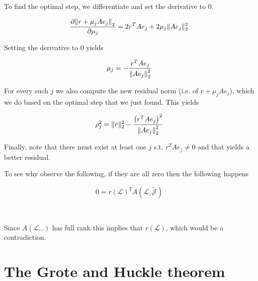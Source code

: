 \documentclass[paper=A4, fontsize=11pt]{scrartcl}
\let\originalleft\left
\let\originalright\right
\renewcommand{\left}{\mathopen{}\mathclose\bgroup\originalleft}
\renewcommand{\right}{\aftergroup\egroup\originalright}
\theoremstyle{remark}
\begin{document}
To find the optimal step, we differentiate and set the derivative to 0. 

\begin{equation}
\begin{aligned}
\frac{\partial \left\|r+\mu_{j} A e_{j}\right\|_{2}}{\partial \mu_{j}} 
& = 2r^{T} A e_{j} + 2\mu_{j}\|A e_{j}\|_{2}^{2}\\
\end{aligned}
\end{equation}

Setting the derivative to $0$ yields

\begin{equation}
\mu_{j}=-\frac{r^{T} A e_{j}}{\left\|A e_{j}\right\|_{2}^{2}}
\end{equation}

For every such $j$ we also compute the new residual norm (i.e. of $r+\mu_{j} A e_{j}$), which we do based on the optimal step that we just found. This yields

\begin{equation}
\rho_{j}^{2}=\|r\|_{2}^{2}-\frac{\left(r^{T} A e_{j}\right)^{2}}{\left\|A e_{j}\right\|_{2}^{2}}
\end{equation}

Finally, note that there must exist at least one $j$ s.t. \(r^{T} A e_{j} \neq 0\) and that yields a better residual.

To see why observe the following, if they are all zero then the following happens

\begin{equation}
0=r(\mathcal{L})^{T} A(\mathcal{L}, \tilde{\mathcal{J}})
\end{equation}

\,

Since \(A(\mathcal{L}, .)\) has full rank this implies that \(r(\mathcal{L})\), which would be a contradiction.

\newpage
	
	
\section{The Grote and Huckle theorem}
\end{document}
